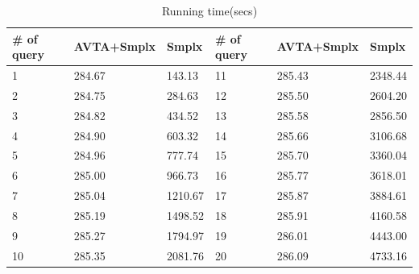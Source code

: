 \documentclass[]{article}
\begin{document}
	
	\begin{table}[!h]
		\centering
		\caption{Running time(secs)}
		\label{tb:nnlsys time}
		\scalebox{0.5}
		{
		\begin{tabular}{|l|l|l|l|l|l|}
			\hline
			\# of query & AVTA+Smplx & Smplx & \# of query & AVTA+Smplx & Smplx \\ \hline
			1           & 284.67       & 143.13  & 11          & 285.43       & 2348.44 \\ \hline
			2           & 284.75       & 284.63  & 12          & 285.50       & 2604.20 \\ \hline
			3           & 284.82       & 434.52  & 13          & 285.58       & 2856.50 \\ \hline
			4           & 284.90       & 603.32  & 14          & 285.66       & 3106.68 \\ \hline
			5           & 284.96       & 777.74  & 15          & 285.70       & 3360.04 \\ \hline
			6           & 285.00       & 966.73  & 16          & 285.77       & 3618.01 \\ \hline
			7           & 285.04       & 1210.67 & 17          & 285.87       & 3884.61 \\ \hline
			8           & 285.19       & 1498.52 & 18          & 285.91       & 4160.58 \\ \hline
			9           & 285.27       & 1794.97 & 19          & 286.01       & 4443.00 \\ \hline
			10          & 285.35       & 2081.76 & 20          & 286.09       & 4733.16 \\ \hline
		\end{tabular}
	}
	\end{table}
\end{document}
